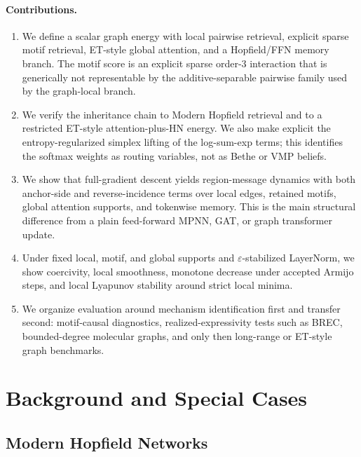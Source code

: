 \documentclass[11pt,a4paper]{article}
\begin{document}
\paragraph{Contributions.}
\begin{enumerate}
\item We define a scalar graph energy with local pairwise retrieval, explicit
  sparse motif retrieval, ET-style global attention, and a Hopfield/FFN memory
  branch. The motif score is an explicit sparse order-3 interaction that is
  generically not representable by the additive-separable pairwise family used
  by the graph-local branch.
\item We verify the inheritance chain to Modern Hopfield retrieval and to a
  restricted ET-style attention-plus-HN energy. We also make explicit the
  entropy-regularized simplex lifting of the log-sum-exp terms; this identifies
  the softmax weights as routing variables, not as Bethe or VMP beliefs.
\item We show that full-gradient descent yields region-message dynamics with
  both anchor-side and reverse-incidence terms over local edges, retained
  motifs, global attention supports, and tokenwise memory. This is the main
  structural difference from a plain feed-forward MPNN, GAT, or graph
  transformer update.
\item Under fixed local, motif, and global supports and
  $\varepsilon$-stabilized LayerNorm, we show coercivity, local smoothness,
  monotone decrease under accepted Armijo steps, and local Lyapunov stability
  around strict local minima.
\item We organize evaluation around mechanism identification first and transfer
  second: motif-causal diagnostics, realized-expressivity tests such as BREC,
  bounded-degree molecular graphs, and only then long-range or ET-style graph
  benchmarks.
\end{enumerate}

\section{Background and Special Cases}

\subsection{Modern Hopfield Networks}
\end{document}
